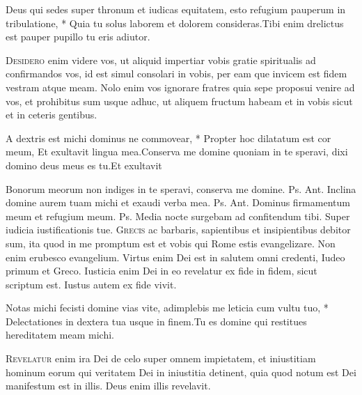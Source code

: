 \begin{multicols*}{2}
\begin{responsory}
{Deus qui sedes super thronum et iudicas equitatem, esto refugium pauperum in tribulatione, * Quia tu solus laborem et dolorem consideras.}{Tibi enim drelictus est pauper pupillo tu eris adiutor.}
\end{responsory}
\lettrine[lines=2]{\zallmancaps \color{Red} D}{esidero} enim videre vos, ut aliquid impertiar vobis gratie spiritualis ad confirmandos vos, id est simul consolari in vobis, per eam que invicem est fidem vestram atque meam. Nolo enim vos ignorare fratres quia sepe proposui venire ad vos, et prohibitus sum usque adhuc, ut aliquem fructum habeam et in vobis sicut et in ceteris gentibus.
\begin{responsory-final}
{A dextris est michi dominus ne commovear, * Propter hoc dilatatum est cor meum,  Et exultavit lingua mea.}{Conserva me domine quoniam in te speravi, dixi domino deus meus es tu.}{Et exultavit}
\end{responsory-final}
 Bonorum meorum non indiges in te speravi, conserva me domine. {\color{Red} Ps.}  {\color{Red} Ant.} Inclina domine aurem tuam michi et exaudi verba mea. {\color{Red} Ps.}  {\color{Red} Ant.} Dominus firmamentum meum et refugium meum. {\color{Red} Ps.}  \V Media nocte surgebam ad confitendum tibi. \R Super iudicia iustificationis tue.
\lettrine[lines=2]{\zallmancaps \color{Blue} G}{recis} ac barbaris, sapientibus et insipientibus debitor sum, ita quod in me promptum est et vobis qui Rome estis evangelizare. Non enim erubesco evangelium. Virtus enim Dei est in salutem omni credenti, Iudeo primum et Greco. Iusticia enim Dei in eo revelatur ex fide in fidem, sicut scriptum est. Iustus autem ex fide vivit.
\begin{responsory}
{Notas michi fecisti domine vias vite, adimplebis me leticia cum vultu tuo, * Delectationes in dextera tua usque in finem.}{Tu es domine qui restitues hereditatem meam michi.}
\end{responsory}
\lettrine[lines=2]{\zallmancaps \color{Red} R}{evelatur} enim ira Dei de celo super omnem impietatem, et iniustitiam hominum eorum qui veritatem Dei in iniustitia detinent, quia quod notum est Dei manifestum est in illis. Deus enim illis revelavit.

\end{multicols*}
